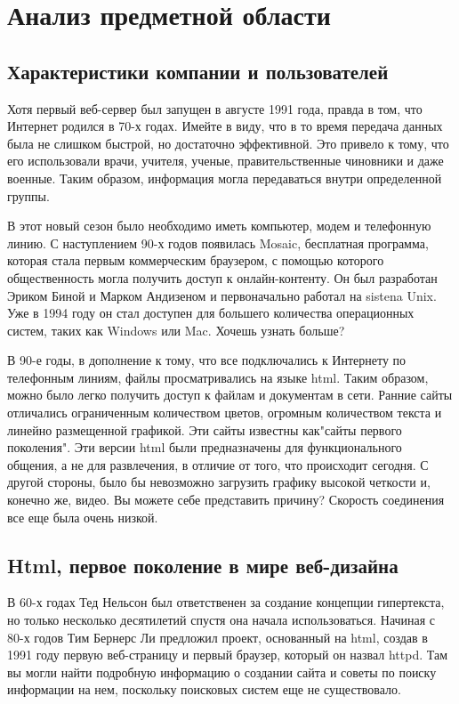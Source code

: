 \newsection
\section{Анализ предметной области}
\subsection{Характеристики компании и пользователей}

Хотя первый веб-сервер был запущен в августе 1991 года, правда в том, что Интернет родился в 70-х годах. Имейте в виду, что в то время передача данных была не слишком быстрой, но достаточно эффективной. Это привело к тому, что его использовали врачи, учителя, ученые, правительственные чиновники и даже военные. Таким образом, информация могла передаваться внутри определенной группы.

В этот новый сезон было необходимо иметь компьютер, модем и телефонную линию. С наступлением 90-х годов появилась Mosaic, бесплатная программа, которая стала первым коммерческим браузером, с помощью которого общественность могла получить доступ к онлайн-контенту. Он был разработан Эриком Биной и Марком Андизеном и первоначально работал на sistena Unix. Уже в 1994 году он стал доступен для большего количества операционных систем, таких как Windows или Mac. Хочешь узнать больше?

В 90-е годы, в дополнение к тому, что все подключались к Интернету по телефонным линиям, файлы просматривались на языке html. Таким образом, можно было легко получить доступ к файлам и документам в сети. Ранние сайты отличались ограниченным количеством цветов, огромным количеством текста и линейно размещенной графикой. Эти сайты известны как"сайты первого поколения". Эти версии html были предназначены для функционального общения, а не для развлечения, в отличие от того, что происходит сегодня. С другой стороны, было бы невозможно загрузить графику высокой четкости и, конечно же, видео. Вы можете себе представить причину? Скорость соединения все еще была очень низкой.

\subsection{Html, первое поколение в мире веб-дизайна}
В 60-х годах Тед Нельсон был ответственен за создание концепции гипертекста, но только несколько десятилетий спустя она начала использоваться. Начиная с 80-х годов Тим Бернерс Ли предложил проект, основанный на html, создав в 1991 году первую веб-страницу и первый браузер, который он назвал httpd. Там вы могли найти подробную информацию о создании сайта и советы по поиску информации на нем, поскольку поисковых систем еще не существовало. 

